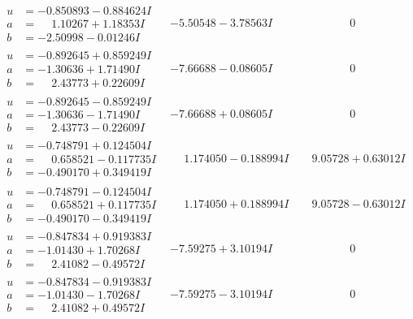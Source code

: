 \documentclass[1p]{elsarticle_modified}
\theoremstyle{definition}
\begin{document}
$$\begin{array}{c|c|c}
\begin{aligned}
u &= -0.850893 - 0.884624 I \\
a &= \phantom{-}1.10267 + 1.18353 I \\
b &= -2.50998 - 0.01246 I\end{aligned}
 & -5.50548 - 3.78563 I & \phantom{-0.000000 } 0 \\ \hline\begin{aligned}
u &= -0.892645 + 0.859249 I \\
a &= -1.30636 + 1.71490 I \\
b &= \phantom{-}2.43773 + 0.22609 I\end{aligned}
 & -7.66688 - 0.08605 I & \phantom{-0.000000 } 0 \\ \hline\begin{aligned}
u &= -0.892645 - 0.859249 I \\
a &= -1.30636 - 1.71490 I \\
b &= \phantom{-}2.43773 - 0.22609 I\end{aligned}
 & -7.66688 + 0.08605 I & \phantom{-0.000000 } 0 \\ \hline\begin{aligned}
u &= -0.748791 + 0.124504 I \\
a &= \phantom{-}0.658521 - 0.117735 I \\
b &= -0.490170 + 0.349419 I\end{aligned}
 & \phantom{-}1.174050 - 0.188994 I & \phantom{-}9.05728 + 0.63012 I \\ \hline\begin{aligned}
u &= -0.748791 - 0.124504 I \\
a &= \phantom{-}0.658521 + 0.117735 I \\
b &= -0.490170 - 0.349419 I\end{aligned}
 & \phantom{-}1.174050 + 0.188994 I & \phantom{-}9.05728 - 0.63012 I \\ \hline\begin{aligned}
u &= -0.847834 + 0.919383 I \\
a &= -1.01430 + 1.70268 I \\
b &= \phantom{-}2.41082 - 0.49572 I\end{aligned}
 & -7.59275 + 3.10194 I & \phantom{-0.000000 } 0 \\ \hline\begin{aligned}
u &= -0.847834 - 0.919383 I \\
a &= -1.01430 - 1.70268 I \\
b &= \phantom{-}2.41082 + 0.49572 I\end{aligned}
 & -7.59275 - 3.10194 I & \phantom{-0.000000 } 0 \\ \hline\begin{aligned}

\end{aligned}
\end{array}$$
\end{document}
